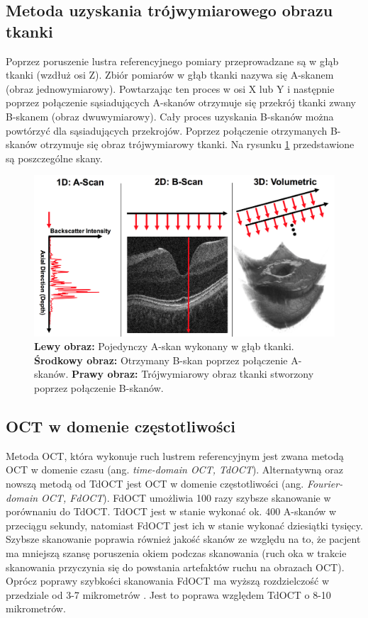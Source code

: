 \subsection{Metoda uzyskania trójwymiarowego obrazu tkanki}

Poprzez poruszenie lustra referencyjnego pomiary przeprowadzane są w głąb tkanki (wzdłuż osi Z). Zbiór pomiarów w głąb tkanki nazywa się A-skanem (obraz jednowymiarowy). Powtarzając ten proces w osi X lub Y i następnie poprzez połączenie sąsiadujących A-skanów otrzymuje się przekrój tkanki zwany B-skanem (obraz dwuwymiarowy). Cały proces uzyskania B-skanów można powtórzyć dla sąsiadujących przekrojów. Poprzez połączenie otrzymanych B-skanów otrzymuje się obraz trójwymiarowy tkanki. Na rysunku \ref{fig:obrazowanie_oct:scan} \cite{Kraus:12} przedstawione są poszczególne skany.

\begin{figure}[htb]
	\centering
	\includegraphics[width=\textwidth]{gfx/scans}
	\caption{\cite{Kraus:12} \textbf{Lewy obraz:} Pojedynczy A-skan wykonany w głąb tkanki. \textbf{Środkowy obraz:} Otrzymany B-skan poprzez połączenie A-skanów. \textbf{Prawy obraz:} Trójwymiarowy obraz tkanki stworzony poprzez połączenie B-skanów.}
	\label{fig:obrazowanie_oct:scan}
\end{figure}

\subsection{OCT w domenie częstotliwości}

Metoda OCT, która wykonuje ruch lustrem referencyjnym jest zwana metodą OCT w domenie czasu (ang. \textit{time-domain OCT, TdOCT}). Alternatywną oraz nowszą metodą od TdOCT jest OCT w domenie częstotliwości (ang. \textit{Fourier-domain OCT, FdOCT}). FdOCT umożliwia 100 razy szybsze \cite{Strong:11} skanowanie w porównaniu do TdOCT. TdOCT jest w stanie wykonać ok. 400 A-skanów w przeciągu sekundy, natomiast FdOCT jest ich w stanie wykonać dziesiątki tysięcy. Szybsze skanowanie poprawia również jakość skanów ze względu na to, że pacjent ma mniejszą szansę poruszenia okiem podczas skanowania (ruch oka w trakcie skanowania przyczynia się do powstania artefaktów ruchu na obrazach OCT). Oprócz poprawy szybkości skanowania FdOCT ma wyższą rozdzielczość w przedziale od 3-7 mikrometrów \cite{Strong:11}. Jest to poprawa względem TdOCT o 8-10 mikrometrów.

